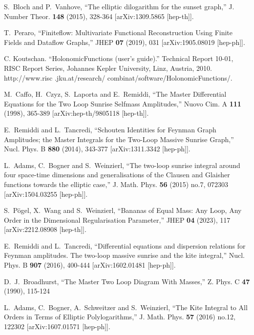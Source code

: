 \documentclass[a4paper,12pt]{article}
\numberwithin{equation}{section}
\numberwithin{figure}{section}
\begin{document}
\begin{thebibliography}{99}
S.~Bloch and P.~Vanhove,
``The elliptic dilogarithm for the sunset graph,''
J. Number Theor. \textbf{148} (2015), 328-364
[arXiv:1309.5865 [hep-th]].
  
T.~Peraro,
``Finiteflow: Multivariate Functional Reconstruction Using Finite Fields and Dataflow Graphs,''
JHEP \textbf{07} (2019), 031
[arXiv:1905.08019 [hep-ph]].


 C. Koutschan. ``HolonomicFunctions (user's guide).'' Technical Report 10-01, RISC Report Series, Johannes Kepler University, Linz, Austria, 2010. http://www.risc
.jku.at/research/ combinat/software/HolonomicFunctions/.

  
M.~Caffo, H.~Czyz, S.~Laporta and E.~Remiddi,
``The Master Differential Equations for the Two Loop Sunrise Selfmass Amplitudes,''
Nuovo Cim. A \textbf{111} (1998), 365-389
[arXiv:hep-th/9805118 [hep-th]].
  
E.~Remiddi and L.~Tancredi,
``Schouten Identities for Feynman Graph Amplitudes; the Master Integrals for the Two-Loop Massive Sunrise Graph,''
Nucl. Phys. B \textbf{880} (2014), 343-377
[arXiv:1311.3342 [hep-ph]].
  
L.~Adams, C.~Bogner and S.~Weinzierl,
``The two-loop sunrise integral around four space-time dimensions and generalisations of the Clausen and Glaisher functions towards the elliptic case,''
J. Math. Phys. \textbf{56} (2015) no.7, 072303
[arXiv:1504.03255 [hep-ph]].

S.~P\"ogel, X.~Wang and S.~Weinzierl,
``Bananas of Equal Mass: Any Loop, Any Order in the Dimensional Regularisation Parameter,''
JHEP \textbf{04} (2023), 117
[arXiv:2212.08908 [hep-th]].

 

E.~Remiddi and L.~Tancredi,
``Differential equations and dispersion relations for Feynman amplitudes. The two-loop massive sunrise and the kite integral,''
Nucl. Phys. B \textbf{907} (2016), 400-444
[arXiv:1602.01481 [hep-ph]].


D.~J.~Broadhurst,
``The Master Two Loop Diagram With Masses,''
Z. Phys. C \textbf{47} (1990), 115-124
  
L.~Adams, C.~Bogner, A.~Schweitzer and S.~Weinzierl,
``The Kite Integral to All Orders in Terms of Elliptic Polylogarithms,''
J. Math. Phys. \textbf{57} (2016) no.12, 122302
[arXiv:1607.01571 [hep-ph]].


\end{thebibliography}
\end{document}
